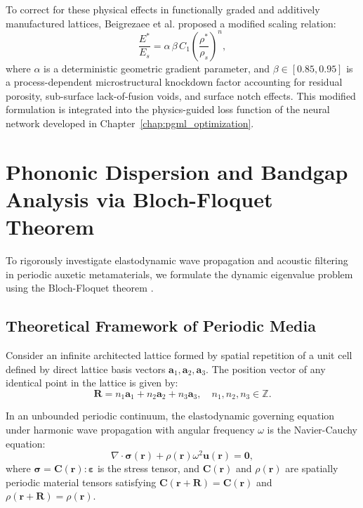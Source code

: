 To correct for these physical effects in functionally graded and additively manufactured lattices, Beigrezaee et al. \cite{beigrezaee2026} proposed a modified scaling relation:
\begin{equation}
\frac{E^*}{E_s} = \alpha \, \beta \, C_1 \left( \frac{\rho^*}{\rho_s} \right)^n,
\label{eq:beigrezaee_modified}
\end{equation}
where $\alpha$ is a deterministic geometric gradient parameter, and $\beta \in [0.85, 0.95]$ is a process-dependent microstructural knockdown factor accounting for residual porosity, sub-surface lack-of-fusion voids, and surface notch effects. This modified formulation is integrated into the physics-guided loss function of the neural network developed in Chapter~\ref{chap:pgml_optimization}.

\section{Phononic Dispersion and Bandgap Analysis via Bloch-Floquet Theorem}
\label{sec:bloch_floquet}

To rigorously investigate elastodynamic wave propagation and acoustic filtering in periodic auxetic metamaterials, we formulate the dynamic eigenvalue problem using the Bloch-Floquet theorem \cite{brillouin1953,hussein2014}.

\subsection{Theoretical Framework of Periodic Media}
\label{subsec:bloch_theory}

Consider an infinite architected lattice formed by spatial repetition of a unit cell defined by direct lattice basis vectors $\mathbf{a}_1, \mathbf{a}_2, \mathbf{a}_3$. The position vector of any identical point in the lattice is given by:
\begin{equation}
\mathbf{R} = n_1 \mathbf{a}_1 + n_2 \mathbf{a}_2 + n_3 \mathbf{a}_3, \quad n_1, n_2, n_3 \in \mathbb{Z}.
\label{eq:lattice_translation}
\end{equation}

In an unbounded periodic continuum, the elastodynamic governing equation under harmonic wave propagation with angular frequency $\omega$ is the Navier-Cauchy equation:
\begin{equation}
\nabla \cdot \boldsymbol{\sigma}(\mathbf{r}) + \rho(\mathbf{r}) \omega^2 \mathbf{u}(\mathbf{r}) = \mathbf{0},
\label{eq:navier_cauchy}
\end{equation}
where $\boldsymbol{\sigma} = \mathbf{C}(\mathbf{r}) : \boldsymbol{\varepsilon}$ is the stress tensor, and $\mathbf{C}(\mathbf{r})$ and $\rho(\mathbf{r})$ are spatially periodic material tensors satisfying $\mathbf{C}(\mathbf{r} + \mathbf{R}) = \mathbf{C}(\mathbf{r})$ and $\rho(\mathbf{r} + \mathbf{R}) = \rho(\mathbf{r})$.

